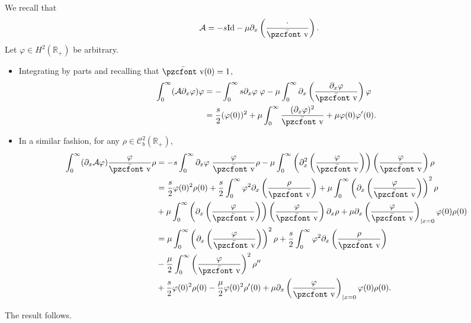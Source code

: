 \documentclass[10pt]{amsart}
\theoremstyle{definition}\newtheorem{defi}[theo]{Definition}\newtheorem{rema}[theo]{Remark}\newtheorem{exam}[theo]{Example}\newtheorem{exem}[theo]{Example}\newtheorem{nota}[theo]{Notation}
\newcommand{\mathpzc}[1]{\text{\pzcfont #1}}
\newcommand{\R}{\mathbb{R}}
\newcommand{\p}{\partial}
\newcommand{\bv}{\bar{\mathpzc{v}}}
\newcommand{\cA}{\mathcal A}
\newcommand{\cC}{\mathcal C}
\newcommand{\rId}{\mathrm{Id}}
\begin{document}
We recall that
\[
\cA=-s\rId - \mu \p_x \left(\frac{\cdot}{\bv}\right).
\]
Let $\varphi \in H^2(\R_+)$ be arbitrary.
\begin{itemize}
\item Integrating by parts and recalling that $\bv(0)=1$,
\begin{align*}
\int_0^\infty (\cA \p_x \varphi) \varphi&= - \int_0^\infty s\p_x \varphi\; \varphi - \mu \int_0^\infty\p_x \left(\frac{\p_x \varphi}{\bv}\right)\varphi\\
&=\frac{s}{2} (\varphi(0))^2 + \mu \int_0^\infty \frac{(\p_x \varphi)^2}{\bv} + \mu \varphi(0) \varphi'(0).
\end{align*}

\item In a similar fashion, for any $\rho\in \cC_b^2(\R_+)$,
\begin{align*}
\int_0^\infty (\p_x\cA \varphi) \frac{\varphi}{\bv} \rho &= -s\int_0^\infty \p_x \varphi \; \frac{\varphi}{\bv} \rho - \mu \int_0^\infty \left(\p_x^2\left(\frac{\varphi}{\bv}\right)\right) \left(\frac{\varphi}{\bv}\right) \rho\\
&= \frac{s}{2} \varphi(0)^2 \rho(0) + \frac{s}{2} \int_0^\infty \varphi^2 \p_x \left(\frac{\rho}{\bv}\right) + \mu \int_0^\infty \left(\p_x\left(\frac{\varphi}{\bv}\right)\right)^2 \rho\\
& + \mu \int_0^\infty \left(\p_x\left(\frac{\varphi}{\bv}\right)\right)\left(\frac{\varphi}{\bv}\right) \p_x \rho + \mu \p_x \left(\frac{\varphi}{\bv}\right)_{|x=0} \varphi(0)\rho(0)\\
&= \mu \int_0^\infty \left(\p_x\left(\frac{\varphi}{\bv}\right)\right)^2 \rho + \frac{s}{2} \int_0^\infty \varphi^2 \p_x \left(\frac{\rho}{\bv}\right)\\
&- \frac{\mu}{2}\int_0^\infty \left(\frac{\varphi}{\bv}\right)^2 \rho''\\
& +\frac{s}{2} \varphi(0)^2 \rho(0) - \frac{\mu}{2}\varphi(0)^2 \rho'(0) + \mu \p_x \left(\frac{\varphi}{\bv}\right)_{|x=0} \varphi(0)\rho(0).
\end{align*}
\end{itemize}
The result follows.

\vspace*{20pt}
\end{document}

